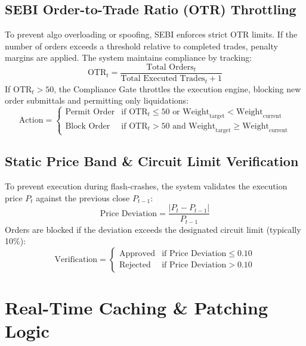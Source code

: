 \documentclass[11pt,a4paper]{article}
\begin{document}
\subsection{SEBI Order-to-Trade Ratio (OTR) Throttling}

To prevent algo overloading or spoofing, SEBI enforces strict OTR limits. If the number of orders exceeds a threshold relative to completed trades, penalty margins are applied. The system maintains compliance by tracking:
\begin{equation}
    \text{OTR}_t = \frac{\text{Total Orders}_t}{\text{Total Executed Trades}_t + 1}
\end{equation}
If $\text{OTR}_t > 50$, the Compliance Gate throttles the execution engine, blocking new order submittals and permitting only liquidations:
\begin{equation}
    \text{Action} = 
    \begin{cases} 
        \text{Permit Order} & \text{if } \text{OTR}_t \le 50 \text{ or } \text{Weight}_{\text{target}} < \text{Weight}_{\text{current}} \\
        \text{Block Order} & \text{if } \text{OTR}_t > 50 \text{ and } \text{Weight}_{\text{target}} \ge \text{Weight}_{\text{current}}
    \end{cases}
\end{equation}

\subsection{Static Price Band \& Circuit Limit Verification}

To prevent execution during flash-crashes, the system validates the execution price $P_t$ against the previous close $P_{t-1}$:
\begin{equation}
    \text{Price Deviation} = \frac{|P_t - P_{t-1}|}{P_{t-1}}
\end{equation}
Orders are blocked if the deviation exceeds the designated circuit limit (typically 10\%):
\begin{equation}
    \text{Verification} = 
    \begin{cases} 
        \text{Approved} & \text{if } \text{Price Deviation} \le 0.10 \\
        \text{Rejected} & \text{if } \text{Price Deviation} > 0.10
    \end{cases}
\end{equation}

\newpage
\section{Real-Time Caching \& Patching Logic}
\end{document}
